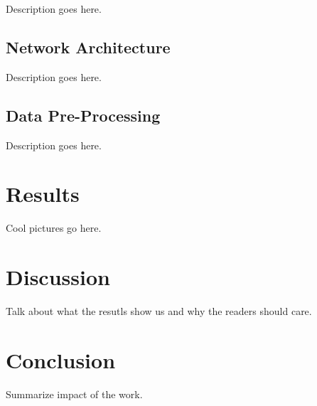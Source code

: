 Description goes here.


\subsection{Network Architecture}
\label{ss:Na}

Description goes here.



\subsection{Data Pre-Processing}
\label{ss:Dpp}

Description goes here.



\section{Results}
\label{s:Results}

Cool pictures go here.



\section{Discussion}
\label{s:Discussion}

Talk about what the resutls show us and why the readers should care.




\section{Conclusion}
\label{s:Conclusion}

Summarize impact of the work.




